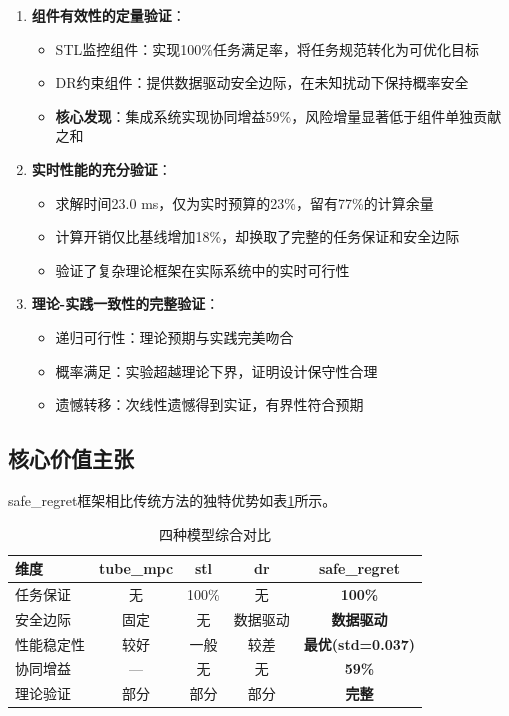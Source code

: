 \documentclass[12pt,a4paper]{ctexart}
\numberwithin{equation}{section}
\begin{document}
\begin{enumerate}[label=(\arabic*)]
    \item \textbf{组件有效性的定量验证}：
    \begin{itemize}
        \item STL监控组件：实现100\%任务满足率，将任务规范转化为可优化目标
        \item DR约束组件：提供数据驱动安全边际，在未知扰动下保持概率安全
        \item \textbf{核心发现}：集成系统实现协同增益59\%，风险增量显著低于组件单独贡献之和
    \end{itemize}

    \item \textbf{实时性能的充分验证}：
    \begin{itemize}
        \item 求解时间23.0 ms，仅为实时预算的23\%，留有77\%的计算余量
        \item 计算开销仅比基线增加18\%，却换取了完整的任务保证和安全边际
        \item 验证了复杂理论框架在实际系统中的实时可行性
    \end{itemize}

    \item \textbf{理论-实践一致性的完整验证}：
    \begin{itemize}
        \item 递归可行性：理论预期与实践完美吻合
        \item 概率满足：实验超越理论下界，证明设计保守性合理
        \item 遗憾转移：次线性遗憾得到实证，有界性符合预期
    \end{itemize}
\end{enumerate}

\subsection{核心价值主张}

safe\_regret框架相比传统方法的独特优势如表\ref{tab:comparison}所示。

\begin{table}[htbp]
    \centering
    \caption{四种模型综合对比}
    \label{tab:comparison}
    \begin{tabular}{lcccc}
        \toprule
        维度 & tube\_mpc & stl & dr & \textbf{safe\_regret} \\
        \midrule
        任务保证 & 无 & 100\% & 无 & \textbf{100\%} \\
        安全边际 & 固定 & 无 & 数据驱动 & \textbf{数据驱动} \\
        性能稳定性 & 较好 & 一般 & 较差 & \textbf{最优(std=0.037)} \\
        协同增益 & — & 无 & 无 & \textbf{59\%} \\
        理论验证 & 部分 & 部分 & 部分 & \textbf{完整} \\
        \bottomrule
    \end{tabular}
\end{table}
\end{document}
